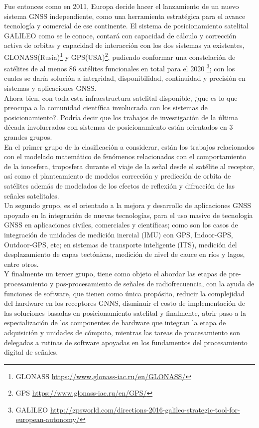 Fue entonces como en 2011, Europa decide hacer el lanzamiento de un nuevo sistema GNSS independiente, como una herramienta estratégica para el avance tecnología y comercial de ese continente. El sistema de posicionamiento satelital GALILEO como se le conoce, contará con capacidad de cálculo y corrección activa de orbitas y capacidad de interacción con los dos sistemas ya existentes, GLONASS(Rusia)\footnote{GLONASS \url{https://www.glonass-iac.ru/en/GLONASS/}} y GPS(USA)\footnote{GPS \url{https://www.glonass-iac.ru/en/GPS/}}, pudiendo conformar una constelación de satélites de al menos 86 satélites funcionales en total para el 2020 \footnote{GALILEO \url{http://gpsworld.com/directions-2016-galileo-strategic-tool-for-european-autonomy/}}; con los cuales se daría solución a integridad, disponibilidad, continuidad y precisión en sistemas y aplicaciones GNSS.\\

Ahora bien, con toda esta infraestructura satelital disponible, ¿que es lo que preocupa a la comunidad científica involucrada con los sistemas de posicionamiento?. Podría decir que los trabajos de investigación de la última década involucrados con sistemas de posicionamiento están orientados en 3 grandes grupos. \\

En el primer grupo de la clasificación a considerar, están los trabajos relacionados con el modelado matemático %
de fenómenos relacionados con el comportamiento de la ionosfera, troposfera durante el viaje de la señal desde el satélite al receptor, así como el planteamiento de modelos corrección y predicción de orbita de satélites además de modelados de los efectos de reflexión y difracción de las señales satelitales. \\

Un segundo grupo, es el orientado a la mejora y desarrollo de aplicaciones GNSS apoyado en la integración de nuevas tecnologías, para el uso masivo de tecnología GNSS en aplicaciones civiles, comerciales y científicas; como son los casos de integración de unidades de medición inercial (IMU) con GPS, Indoor-GPS, Outdoor-GPS, etc; en sistemas de transporte inteligente (ITS), medición del desplazamiento de capas tectónicas, medición de nivel de cauce en ríos y lagos, entre otros.\\

Y finalmente un tercer grupo, tiene como objeto el abordar las etapas de pre-procesamiento y pos-procesamiento de señales de radiofrecuencia, con la ayuda de funciones de software, que tienen como única propósito, reducir la complejidad del hardware en los receptores GNNS, disminuir el costo de implementación de las soluciones basadas en posicionamiento satelital y finalmente, abrir paso a la especialización de los componentes de hardware que integran la etapa de adquisición y unidades de cómputo, mientras las tareas de procesamiento son delegadas a rutinas de software apoyadas en los fundamentos del procesamiento digital de señales.\\